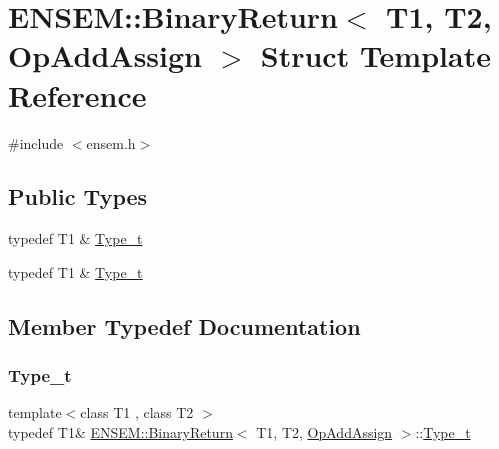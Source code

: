 \hypertarget{structENSEM_1_1BinaryReturn_3_01T1_00_01T2_00_01OpAddAssign_01_4}{}\section{E\+N\+S\+EM\+:\+:Binary\+Return$<$ T1, T2, Op\+Add\+Assign $>$ Struct Template Reference}
\label{structENSEM_1_1BinaryReturn_3_01T1_00_01T2_00_01OpAddAssign_01_4}


{\ttfamily \#include $<$ensem.\+h$>$}

\subsection*{Public Types}
\begin{DoxyCompactItemize}
\item 
typedef T1 \& \mbox{\hyperlink{structENSEM_1_1BinaryReturn_3_01T1_00_01T2_00_01OpAddAssign_01_4_a6d1b6a141221e93d9b7af97762049ec0}{Type\+\_\+t}}
\item 
typedef T1 \& \mbox{\hyperlink{structENSEM_1_1BinaryReturn_3_01T1_00_01T2_00_01OpAddAssign_01_4_a6d1b6a141221e93d9b7af97762049ec0}{Type\+\_\+t}}
\end{DoxyCompactItemize}


\subsection{Member Typedef Documentation}
\mbox{\label{structENSEM_1_1BinaryReturn_3_01T1_00_01T2_00_01OpAddAssign_01_4_a6d1b6a141221e93d9b7af97762049ec0}} 
\subsubsection{\texorpdfstring{Type\_t}{Type\_t}\hspace{0.1cm}{\footnotesize\ttfamily [1/2]}}
{\footnotesize\ttfamily template$<$class T1 , class T2 $>$ \\
typedef T1\& \mbox{\hyperlink{structENSEM_1_1BinaryReturn}{E\+N\+S\+E\+M\+::\+Binary\+Return}}$<$ T1, T2, \mbox{\hyperlink{structENSEM_1_1OpAddAssign}{Op\+Add\+Assign}} $>$\+::\mbox{\hyperlink{structENSEM_1_1BinaryReturn_3_01T1_00_01T2_00_01OpAddAssign_01_4_a6d1b6a141221e93d9b7af97762049ec0}{Type\+\_\+t}}}

